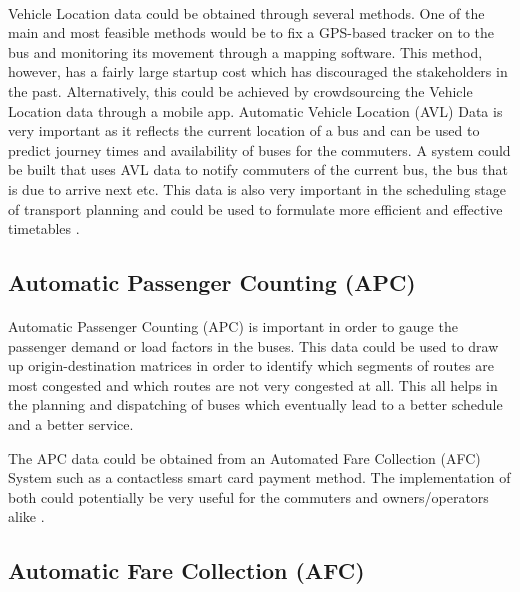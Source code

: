 \documentclass[12pt, oneside]{report}
\begin{document}
\paragraph{ } Vehicle Location data could be obtained through several methods. One of the main and most feasible methods would be to fix a GPS-based tracker on to the bus and monitoring its movement through a mapping software. This method, however, has a fairly large startup cost which has discouraged the stakeholders in the past. Alternatively, this could be achieved by crowdsourcing the Vehicle Location data through a mobile app. Automatic Vehicle Location (AVL) Data is very important as it reflects the current location of a bus and can be used to predict journey times and availability of buses for the commuters. A system could be built that uses AVL data to notify commuters of the current bus, the bus that is due to arrive next etc. This data is also very important in the scheduling stage of transport planning and could be used to formulate more efficient and effective timetables \citep{Wilson2009}.

\subsection{Automatic Passenger Counting (APC)}

\paragraph{ } Automatic Passenger Counting (APC) is important in order to gauge the passenger demand or load factors in the buses. This data could be used to draw up origin-destination matrices in order to identify which segments of routes are most congested and which routes are not very congested at all. This all helps in the planning and dispatching of buses which eventually lead to a better schedule and a better service.

The APC data could be obtained from an Automated Fare Collection (AFC) System such as a contactless smart card payment method. The implementation of both could potentially be very useful for the commuters and owners/operators alike \citep{Wilson2009, Silva2010}.

\subsection{Automatic Fare Collection (AFC)}
\end{document}
